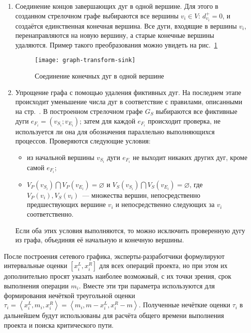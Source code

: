 \begin{enumerate}
\begin{enumerate}
	\end{enumerate}
	\item Соединение концов завершающих дуг в одной вершине. Для этого в созданном стрелочном графе выбираются все вершины $v_i \in V$: $d_{v_i}^+=0$, и создаётся единственная конечная вершина. Все дуги, входящие в вершины $v_i$, перенаправляются на новую вершину, а старые конечные вершины удаляются. Пример такого преобразования можно увидеть на рис.~\ref{fig:graph-transform-sink}
	\begin{figure}[h!]
		\centering
		{
			\texttt{[image: graph-transform-sink]}
		}
		\caption{Соединение конечных дуг в одной вершине}
		\label{fig:graph-transform-sink}
	\end{figure}
	\item Упрощение графа с помощью удаления фиктивных дуг. На последнем этапе происходит уменьшение числа дуг в соответствие с правилами, описанными на стр.~\pageref{Taha:ConversionRules}. В построенном стрелочном графе $G_S$ выбираются все фиктивные дуги $e_{F_i}=\left(v_{S_i}; v_{E_i}\right)$; затем для каждой $e_{F_i}$ происходит проверка, не используется ли она для обозначения параллельно выполняющихся процессов. Проверяются следующие условия:
	\begin{itemize}
		\item из начальной вершины $v_{S_i}$ дуги $e_{F_i}$ не выходит никаких других дуг, кроме самой $e_{F_i}$;
		\item $V_P(v_{S_i}) \bigcap V_P(v_{E_i}) = \varnothing $ и $V_S(v_{S_i}) \bigcap V_S(v_{E_i}) = \varnothing$, где $V_P(v_i), V_S(v_i)$~--- множества вершин, непосредственно предшествующих вершине $v_i$ и непосредственно следующих за $v_i$ соответственно.
	\end{itemize}
	 Если оба этих условия выполняются, то можно исключить проверенную дугу из графа, объединяя её начальную и конечную вершины.
\end{enumerate}

После построения сетевого графика, эксперты-разработчики формулируют интервальные оценки $\left[ x_i^L, x_i^R \right]$ для всех операций проекта, но при этом их дополнительно просят указать наиболее возможный, с их точки зрения, срок выполнения операции $m_i$. Вместе эти три параметра используются для формирования нечёткой треугольной оценки $\tau_i=\left \langle x_i^L, m_i, x_i^R \right \rangle = \left \langle m_i, m-x_i^L, x_i^R-m \right \rangle$. Полученные нечёткие оценки $\tau_i$ в дальнейшем будут использованы для расчёта общего времени выполнения проекта и поиска критического пути.

